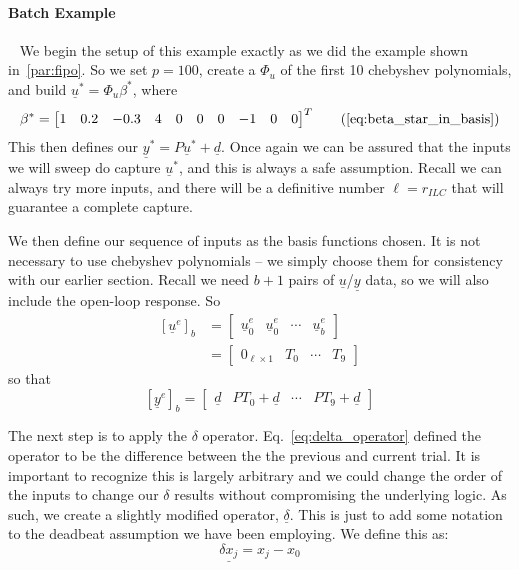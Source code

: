 \FloatBarrier\paragraph{Batch Example}
~\label{par:batch_ex}
We begin the setup of this example exactly as we did the example shown in~\ref{par:fipo}. So we set $p=100$, create a $\Phi_u$ of the first 10 chebyshev polynomials, and build $\underline{u}^\ast = \Phi_u \beta^\ast$, where
\begin{equation}
    \beta^\ast = {\begin{bmatrix}1 & 0.2 & -0.3 & 4 & 0 & 0 & 0 & -1 & 0 & 0\end{bmatrix}}^T
    \tag{\ref{eq:beta_star_in_basis}}
\end{equation}
This then defines our $\underline{y}^\ast = P\underline{u}^\ast + \underline{d}$. Once again we can be assured that the inputs we will sweep do capture $\underline{u}^\ast$, and this is always a safe assumption. Recall we can always try more inputs, and there will be a definitive number $\ell = r_{ILC}$ that will guarantee a complete capture.

We then define our sequence of inputs as the basis functions chosen. It is not necessary to use chebyshev polynomials -- we simply choose them for consistency with our earlier section. Recall we need $b+1$ pairs of $\underline{u}$/$\underline{y}$ data, so we will also include the open-loop response. So
\begin{equation}
    \begin{split}
        {\left[\underline{u}^e\right]}_b  &= 
        \begin{bmatrix}
            \underline{u}_0^e & \underline{u}_0^e & \cdots & \underline{u}_b^e
        \end{bmatrix}
        \\ &= 
        \begin{bmatrix}
            0_{\ell \times 1} & T_0 & \cdots & T_9
        \end{bmatrix}
    \end{split}
\end{equation}
so that
\begin{equation}
    {\left[\underline{y}^e\right]}_b  = 
    \begin{bmatrix}
        \underline{d} & PT_0+\underline{d} & \cdots & PT_9+\underline{d}
    \end{bmatrix}
\end{equation}

The next step is to apply the $\delta$ operator. Eq.~\ref{eq:delta_operator} defined the operator to be the difference between the the previous and current trial. It is important to recognize this is largely arbitrary and we could change the order of the inputs to change our $\delta$ results without compromising the underlying logic. As such, we create a slightly modified operator, $\underline{\delta}$. This is just to add some notation to the deadbeat assumption we have been employing. We define this as:
\begin{equation}
    \underline{\delta x_j} = x_j - x_0
\end{equation}

